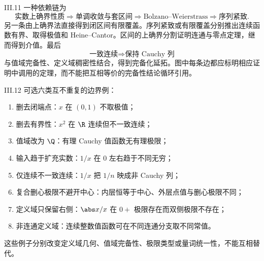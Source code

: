 \begin{solution}{III.11}
一种依赖链为
\[
 \text{实数上确界性质}
 \Longrightarrow
 \text{单调收敛与套区间}
 \Longrightarrow
 \text{Bolzano--Weierstrass}
 \Longrightarrow
 \text{序列紧致}.
\]
另一条由上确界法直接得到闭区间有限覆盖。序列紧致或有限覆盖分别推出连续函数有界、取得极值和 Heine--Cantor。区间的上确界分割证明连通与零点定理，继而得到介值。最后
\[
 \text{一致连续}\Longrightarrow\text{保持 Cauchy 列}
\]
与值域完备性、定义域稠密性结合，得到完备化延拓。图中每条边都应标明相应证明中调用的定理，而不能把互相等价的完备性结论循环引用。
\end{solution}

\begin{solution}{III.12}
可选六类互不重复的边界例：
\begin{enumerate}
 \item 删去闭端点：\(x\) 在 \((0,1)\) 不取极值；
 \item 删去有界性：\(x^2\) 在 \(\R\) 连续但不一致连续；
 \item 值域改为 \(\Q\)：有理 Cauchy 值函数无有理极限；
 \item 输入趋于扩充实数：\(1/x\) 在 \(0\) 左右趋于不同无穷；
 \item 仅连续不一致连续：\(1/x\) 把 \(1/n\) 映成非 Cauchy 列；
 \item 复合删心极限不避开中心：内层恒等于中心、外层点值与删心极限不同；
 \item 定义域只保留右侧：\(\abs x/x\) 在 \(0+\) 极限存在而双侧极限不存在；
 \item 非连通定义域：连续整数值函数可在不同连通分支取不同常值。
\end{enumerate}
这些例子分别改变定义域几何、值域完备性、极限类型或量词统一性，不能互相替代。
\end{solution}
